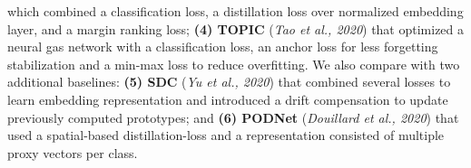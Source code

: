 \documentclass[preprint,11pt]{elsarticle}
\begin{document}
        which combined a classification loss, a distillation loss over
        normalized embedding layer, and a margin ranking loss;
        \textbf{(4) TOPIC} (\textit{Tao et al., 2020}\cite{tao2020few}) that optimized a neural gas
        network with a classification loss, an anchor loss for less
        forgetting stabilization and a min-max loss to reduce overfitting.
        We also compare with two additional baselines: \textbf{(5)
        SDC} (\textit{Yu et al., 2020}\cite{yu2020semantic}) that combined several losses to learn embedding representation and introduced a drift compensation
        to update previously computed prototypes; and \textbf{(6)
        PODNet} (\textit{Douillard et al., 2020}\cite{douillard2020podnet}) that used a spatial-based
        distillation-loss and a representation consisted of multiple
        proxy vectors per class.
\end{document}
